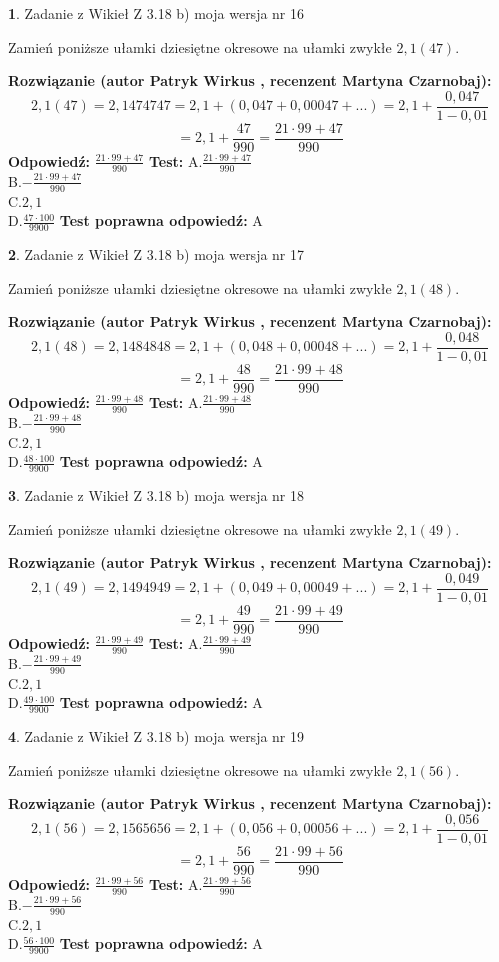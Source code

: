 \documentclass[12pt, a4paper]{article}
\theoremstyle{definition} %
\newtheorem{zad}{}
\newcommand{\zadStart}[1]{\begin{zad}#1\newline}
\newcommand{\zadStop}{\end{zad}}
\newcommand{\rozwStart}[2]{\noindent \textbf{Rozwiązanie (autor #1 , recenzent #2): }\newline}
\newcommand{\rozwStop}{\newline}
\newcommand{\odpStart}{\noindent \textbf{Odpowiedź:}\newline}
\newcommand{\odpStop}{\newline}
\newcommand{\testStart}{\noindent \textbf{Test:}\newline}
\newcommand{\testStop}{\newline}
\newcommand{\kluczStart}{\noindent \textbf{Test poprawna odpowiedź:}\newline}
\newcommand{\kluczStop}{\newline}
\begin{document}
\zadStart{Zadanie z Wikieł Z 3.18 b) moja wersja nr 16}

Zamień poniższe ułamki dziesiętne okresowe na ułamki zwykłe $2,1(47)$.
\zadStop
\rozwStart{Patryk Wirkus}{Martyna Czarnobaj}
$$2,1(47)=2,1474747=2,1+(0,047+0,00047+...)=2,1+\frac{0,047}{1-0,01}$$
$$=2,1+\frac{47}{990}=\frac{21\cdot99+47}{990}$$
\rozwStop
\odpStart
$\frac{21\cdot99+47}{990}$
\odpStop
\testStart
A.$\frac{21\cdot99+47}{990}$\\ B.$-\frac{21\cdot99+47}{990}$\\ C.$2,1$\\ D.$\frac{47\cdot100}{9900}$
\testStop
\kluczStart
A
\kluczStop



\zadStart{Zadanie z Wikieł Z 3.18 b) moja wersja nr 17}

Zamień poniższe ułamki dziesiętne okresowe na ułamki zwykłe $2,1(48)$.
\zadStop
\rozwStart{Patryk Wirkus}{Martyna Czarnobaj}
$$2,1(48)=2,1484848=2,1+(0,048+0,00048+...)=2,1+\frac{0,048}{1-0,01}$$
$$=2,1+\frac{48}{990}=\frac{21\cdot99+48}{990}$$
\rozwStop
\odpStart
$\frac{21\cdot99+48}{990}$
\odpStop
\testStart
A.$\frac{21\cdot99+48}{990}$\\ B.$-\frac{21\cdot99+48}{990}$\\ C.$2,1$\\ D.$\frac{48\cdot100}{9900}$
\testStop
\kluczStart
A
\kluczStop



\zadStart{Zadanie z Wikieł Z 3.18 b) moja wersja nr 18}

Zamień poniższe ułamki dziesiętne okresowe na ułamki zwykłe $2,1(49)$.
\zadStop
\rozwStart{Patryk Wirkus}{Martyna Czarnobaj}
$$2,1(49)=2,1494949=2,1+(0,049+0,00049+...)=2,1+\frac{0,049}{1-0,01}$$
$$=2,1+\frac{49}{990}=\frac{21\cdot99+49}{990}$$
\rozwStop
\odpStart
$\frac{21\cdot99+49}{990}$
\odpStop
\testStart
A.$\frac{21\cdot99+49}{990}$\\ B.$-\frac{21\cdot99+49}{990}$\\ C.$2,1$\\ D.$\frac{49\cdot100}{9900}$
\testStop
\kluczStart
A
\kluczStop



\zadStart{Zadanie z Wikieł Z 3.18 b) moja wersja nr 19}

Zamień poniższe ułamki dziesiętne okresowe na ułamki zwykłe $2,1(56)$.
\zadStop
\rozwStart{Patryk Wirkus}{Martyna Czarnobaj}
$$2,1(56)=2,1565656=2,1+(0,056+0,00056+...)=2,1+\frac{0,056}{1-0,01}$$
$$=2,1+\frac{56}{990}=\frac{21\cdot99+56}{990}$$
\rozwStop
\odpStart
$\frac{21\cdot99+56}{990}$
\odpStop
\testStart
A.$\frac{21\cdot99+56}{990}$\\ B.$-\frac{21\cdot99+56}{990}$\\ C.$2,1$\\ D.$\frac{56\cdot100}{9900}$
\testStop
\kluczStart
A
\kluczStop
\end{document}
